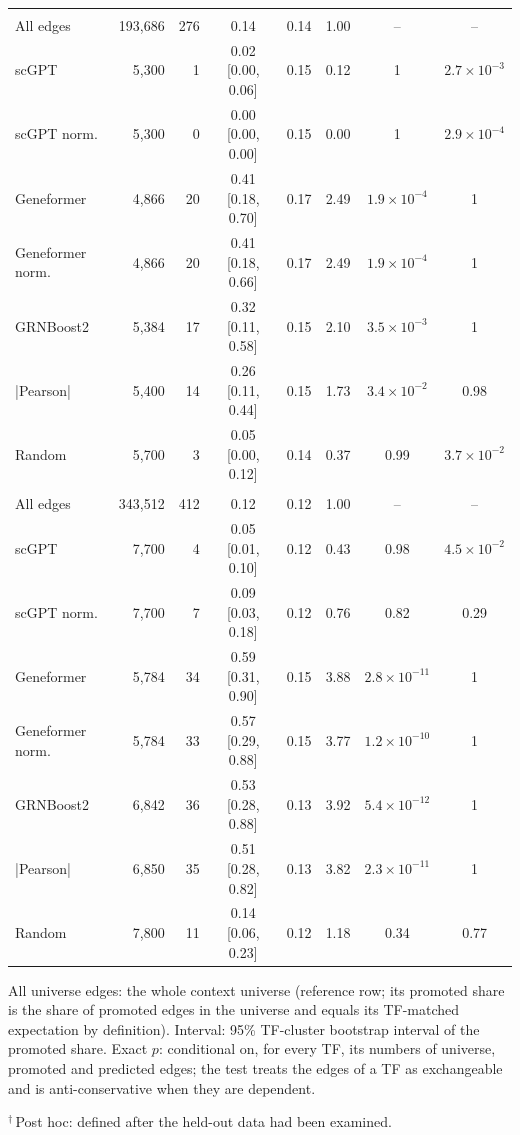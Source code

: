 \documentclass[11pt,a4paper]{article}
\begin{document}
\begin{table}[tbp]
\begin{tabular}{@{}lrrcrccc@{}}
\addlinespace[3pt]
\multicolumn{8}{@{}l}{\emph{Kidney}} \\
All edges & 193{,}686 & 276 & 0.14 & 0.14 & 1.00 & -- & -- \\
scGPT & 5{,}300 & 1 & 0.02 [0.00, 0.06] & 0.15 & 0.12 & 1 & $2.7\times 10^{-3}$ \\
scGPT norm. & 5{,}300 & 0 & 0.00 [0.00, 0.00] & 0.15 & 0.00 & 1 & $2.9\times 10^{-4}$ \\
Geneformer & 4{,}866 & 20 & 0.41 [0.18, 0.70] & 0.17 & 2.49 & $1.9\times 10^{-4}$ & 1 \\
Geneformer norm. & 4{,}866 & 20 & 0.41 [0.18, 0.66] & 0.17 & 2.49 & $1.9\times 10^{-4}$ & 1 \\
GRNBoost2 & 5{,}384 & 17 & 0.32 [0.11, 0.58] & 0.15 & 2.10 & $3.5\times 10^{-3}$ & 1 \\
|Pearson| & 5{,}400 & 14 & 0.26 [0.11, 0.44] & 0.15 & 1.73 & $3.4\times 10^{-2}$ & 0.98 \\
Random & 5{,}700 & 3 & 0.05 [0.00, 0.12] & 0.14 & 0.37 & 0.99 & $3.7\times 10^{-2}$ \\
\addlinespace[3pt]
\multicolumn{8}{@{}l}{\emph{Lung}} \\
All edges & 343{,}512 & 412 & 0.12 & 0.12 & 1.00 & -- & -- \\
scGPT & 7{,}700 & 4 & 0.05 [0.01, 0.10] & 0.12 & 0.43 & 0.98 & $4.5\times 10^{-2}$ \\
scGPT norm. & 7{,}700 & 7 & 0.09 [0.03, 0.18] & 0.12 & 0.76 & 0.82 & 0.29 \\
Geneformer & 5{,}784 & 34 & 0.59 [0.31, 0.90] & 0.15 & 3.88 & $2.8\times 10^{-11}$ & 1 \\
Geneformer norm. & 5{,}784 & 33 & 0.57 [0.29, 0.88] & 0.15 & 3.77 & $1.2\times 10^{-10}$ & 1 \\
GRNBoost2 & 6{,}842 & 36 & 0.53 [0.28, 0.88] & 0.13 & 3.92 & $5.4\times 10^{-12}$ & 1 \\
|Pearson| & 6{,}850 & 35 & 0.51 [0.28, 0.82] & 0.13 & 3.82 & $2.3\times 10^{-11}$ & 1 \\
Random & 7{,}800 & 11 & 0.14 [0.06, 0.23] & 0.12 & 1.18 & 0.34 & 0.77 \\
\bottomrule
\end{tabular}
\par\smallskip
\begin{minipage}{\linewidth}\footnotesize
All universe edges: the whole context universe (reference row; its promoted share is the share of promoted edges in the universe and equals its TF-matched expectation by definition). Interval: 95\% TF-cluster bootstrap interval of the promoted share. Exact $p$: conditional on, for every TF, its numbers of universe, promoted and predicted edges; the test treats the edges of a TF as exchangeable and is anti-conservative when they are dependent.

$^{\dagger}$\,Post hoc: defined after the held-out data had been examined.
\end{minipage}
\end{table}
\end{document}
